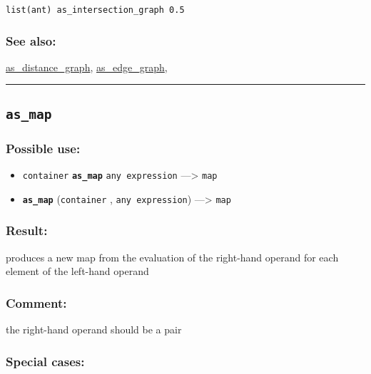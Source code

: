 \documentclass[]{book}
\providecommand{\tightlist}{%
  \setlength{\itemsep}{0pt}\setlength{\parskip}{0pt}}
\theoremstyle{definition}
\theoremstyle{definition}
\theoremstyle{definition}
\theoremstyle{remark}
\begin{document}
\begin{verbatim}
list(ant) as_intersection_graph 0.5 
\end{verbatim}

\subsubsection{See also:}\label{see-also-36}

\href{OperatorsAA\#as_distance_graph}{as\_distance\_graph},
\href{OperatorsAA\#as_edge_graph}{as\_edge\_graph},

\begin{center}\rule{0.5\linewidth}{\linethickness}\end{center}

\subsection{\texorpdfstring{\texttt{as\_map}}{as\_map}}\label{as_map}

\subsubsection{Possible use:}\label{possible-use-52}

\begin{itemize}
\tightlist
\item
  \texttt{container} \textbf{\texttt{as\_map}} \texttt{any\ expression}
  ---\textgreater{} \texttt{map}
\item
  \textbf{\texttt{as\_map}} (\texttt{container} ,
  \texttt{any\ expression}) ---\textgreater{} \texttt{map}
\end{itemize}

\subsubsection{Result:}\label{result-51}

produces a new map from the evaluation of the right-hand operand for
each element of the left-hand operand

\subsubsection{Comment:}\label{comment-11}

the right-hand operand should be a pair

\subsubsection{Special cases:}\label{special-cases-20}
\end{document}
